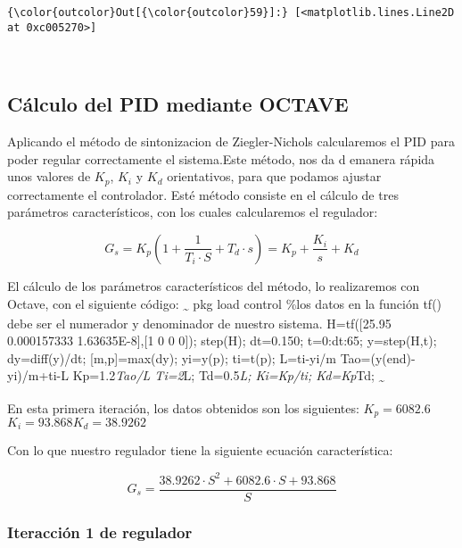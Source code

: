 \documentclass{article}
\begin{document}
            \begin{Verbatim}[commandchars=\\\{\}]
{\color{outcolor}Out[{\color{outcolor}59}]:} [<matplotlib.lines.Line2D at 0xc005270>]
\end{Verbatim}
        
    \begin{center}
    \end{center}
    { \hspace*{\fill} \\}
    
    \subsection{Cálculo del PID mediante
OCTAVE}\label{cuxe1lculo-del-pid-mediante-octave}

    Aplicando el método de sintonizacion de Ziegler-Nichols calcularemos el
PID para poder regular correctamente el sistema.Este método, nos da d
emanera rápida unos valores de \(K_p\), \(K_i\) y \(K_d\) orientativos,
para que podamos ajustar correctamente el controlador. Esté método
consiste en el cálculo de tres parámetros característicos, con los
cuales calcularemos el regulador:

\[G_s=K_p(1+\frac{1}{T_i·S}+T_d·s)=K_p+\frac{K_i}{s}+K_d\]

El cálculo de los parámetros característicos del método, lo realizaremos
con Octave, con el siguiente código: \textsubscript{\textasciitilde{}}
pkg load control \%los datos en la función tf() debe ser el numerador y
denominador de nuestro sistema. H=tf({[}25.95 0.000157333
1.63635E-8{]},{[}1 0 0 0{]}); step(H); dt=0.150; t=0:dt:65; y=step(H,t);
dy=diff(y)/dt; {[}m,p{]}=max(dy); yi=y(p); ti=t(p); L=ti-yi/m
Tao=(y(end)-yi)/m+ti-L Kp=1.2\emph{Tao/L Ti=2}L; Td=0.5\emph{L;
Ki=Kp/ti; Kd=Kp}Td; \textsubscript{\textasciitilde{}}

En esta primera iteración, los datos obtenidos son los siguientes:
\(K_p = 6082.6\) \(K_i=93.868 K_d=38.9262\)

Con lo que nuestro regulador tiene la siguiente ecuación característica:

\[G_s = \frac{38.9262·S^2 + 6082.6·S + 93.868}{S}\]

    \subsubsection{Iteracción 1 de
regulador}\label{iteracciuxf3n-1-de-regulador}
\end{document}
